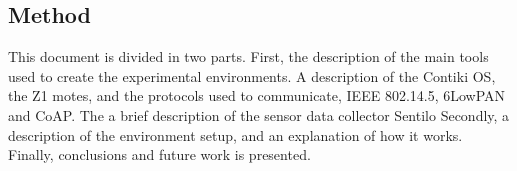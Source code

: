 \subsection{Method}

This document is divided in two parts.
First,
	the description of the main tools used to create the experimental environments.
A description of the Contiki OS,
	the Z1 motes,
	and the protocols used to communicate,
	IEEE 802.14.5, 6LowPAN and CoAP.
The a brief description of the sensor data collector Sentilo Secondly,
	a description of the environment setup,
	and an explanation of how it works.
Finally,
	conclusions and future work is presented.



